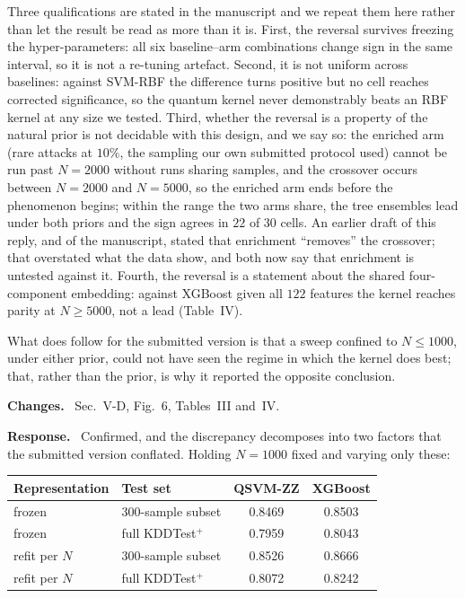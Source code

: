 \documentclass[11pt,a4paper]{article}
\newcommand{\itemhead}[2]{%
  \par\addvspace{15pt}%
  \noindent{\bfseries\color{tagink}#1}\hspace{0.7em}{\bfseries #2}%
  \par\addvspace{3.5pt}%
  \noindent{\color{rulegray}\rule{\linewidth}{0.5pt}}%
  \par\addvspace{5pt}%
  \nobreak}
\newcommand{\resp}{\par\addvspace{2pt}\noindent\textbf{Response.}\ }
\newcommand{\changed}{\par\addvspace{5pt}\noindent
  {\bfseries\color{tagink}Changes.}\ }
\begin{document}
Three qualifications are stated in the manuscript and we repeat them here rather
than let the result be read as more than it is. First, the reversal survives
freezing the hyper-parameters: all six baseline--arm combinations change sign in
the same interval, so it is not a re-tuning artefact. Second, it is not uniform
across baselines: against SVM-RBF the difference turns positive but no cell
reaches corrected significance, so the quantum kernel never demonstrably beats
an RBF kernel at any size we tested. Third, whether the reversal is a property
of the natural prior is not decidable with this design, and we say so: the
enriched arm (rare attacks at $10\%$, the sampling our own submitted protocol
used) cannot be run past $N=2000$ without runs sharing samples, and the
crossover occurs between $N=2000$ and $N=5000$, so the enriched arm ends
before the phenomenon begins; within the range the two arms share, the tree
ensembles lead under both priors and the sign agrees in $22$ of $30$ cells.
An earlier draft of this reply, and of the manuscript, stated that enrichment
``removes'' the crossover; that overstated what the data show, and both now
say that enrichment is untested against it. Fourth, the reversal is a statement
about the shared four-component embedding: against XGBoost given all $122$
features the kernel reaches parity at $N\geq5000$, not a lead (Table~IV).

What does follow for the submitted version is that a sweep confined to
$N\leq1000$, under either prior, could not have seen the regime in which the
kernel does best; that, rather than the prior, is why it reported the opposite
conclusion.
\changed
Sec.~V-D, Fig.~6, Tables~III and~IV.

\itemhead{R1-8}{Table~VI ($N=1000$) inconsistent with Table~IV}
\resp
Confirmed, and the discrepancy decomposes into two factors that the submitted
version conflated. Holding $N=1000$ fixed and varying only these:

\begin{center}
\small
\begin{tabular}{@{}llcc@{}}
\toprule
Representation & Test set & QSVM-ZZ & XGBoost \\
\midrule
frozen        & 300-sample subset & 0.8469 & 0.8503 \\
frozen        & full KDDTest$^{+}$ & 0.7959 & 0.8043 \\
refit per $N$ & 300-sample subset & 0.8526 & 0.8666 \\
refit per $N$ & full KDDTest$^{+}$ & 0.8072 & 0.8242 \\
\bottomrule
\end{tabular}
\end{center}
\end{document}
